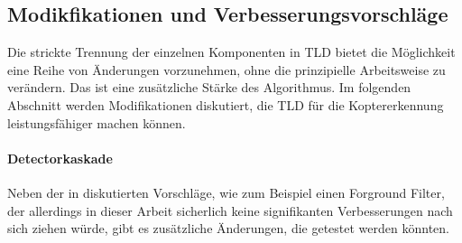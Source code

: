 
\subsection{Modikfikationen und Verbesserungsvorschläge}
Die strickte Trennung der einzelnen Komponenten in TLD bietet die Möglichkeit eine Reihe von Änderungen vorzunehmen, ohne die prinzipielle Arbeitsweise zu verändern. Das ist eine zusätzliche Stärke des Algorithmus. Im folgenden Abschnitt werden Modifikationen diskutiert, die TLD für die Koptererkennung leistungsfähiger machen können.

\paragraph{Detectorkaskade}
Neben der in \cite{TLD} diskutierten Vorschläge, wie zum Beispiel einen Forground Filter, der allerdings in dieser Arbeit sicherlich keine signifikanten Verbesserungen nach sich ziehen würde, gibt es zusätzliche Änderungen, die getestet werden könnten.

